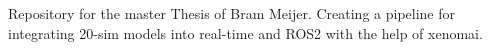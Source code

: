 Repository for the master Thesis of Bram Meijer. Creating a pipeline for integrating 20-\/sim models into real-\/time and ROS2 with the help of xenomai. 
